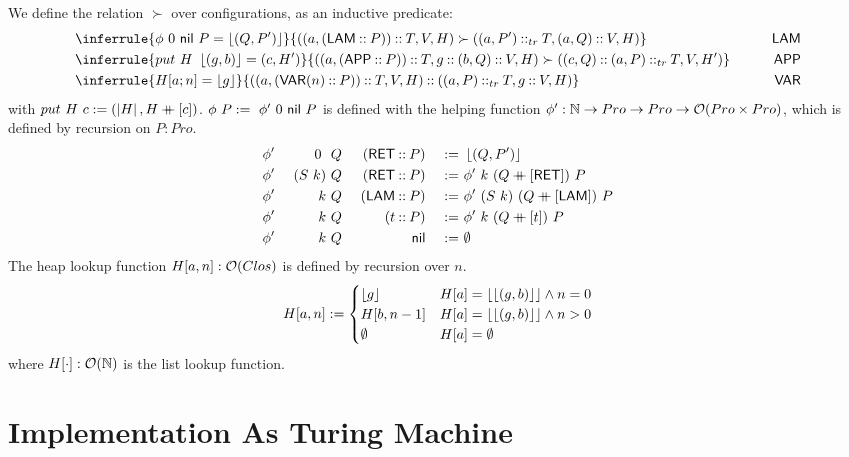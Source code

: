\begin{definition}
  We define the relation $\succ$ over configurations, as an inductive predicate:
  \begin{alignat*}{2}
    & \inferrule{\phi~0~\nil~P = \Some{(Q, P')}}{\left((a, (\MS{LAM} \cons P)) \cons T, V, H\right) \succ \left((a, P') \cons_{tr} T, (a,Q) \cons V, H\right) }
    \qquad& \MS{LAM} & \\
    & \inferrule{put~H~\Some{(g,b)} = (c,H')}{\left((a, (\MS{APP} \cons P)) \cons T, g \cons (b, Q) \cons V, H\right) \succ \left((c, Q) \cons (a,P) \cons_{tr} T, V, H'\right)}
    \qquad& \MS{APP} \\
    & \inferrule{H[a;n]=\Some{g}}{\left((a, (\MS{VAR}(n) \cons P)) \cons T, V, H\right) \cons \left((a, P) \cons_{tr} T, g \cons V, H\right)}
    \qquad& \MS{VAR} &
  \end{alignat*}
  with $ put~H~c := (\left| H \right|, H \mathbin{+\mkern-10mu+} [c]) $. $\phi~P :=~ \phi'~0~\mathsf{nil}~P$ is defined with the helping function
  $\phi' : \mathbb{N} \rightarrow Pro \rightarrow Pro \rightarrow \mathcal{O}(Pro \times Pro)$, which is defined by recursion on $P:Pro$.
  \begin{alignat*}{4}
    &\phi'&~0~   &~Q&~(\mathsf{RET} \mathbin{::} P) &&~:=~& \left\lfloor {(Q,P')} \right\rfloor \\
    &\phi'&~(S~k)&~Q&~(\mathsf{RET} \mathbin{::} P) &&~:=~& \phi'~k~(Q \mathbin{+\mkern-10mu+} [\mathsf{RET}])~P \\
    &\phi'&~k    &~Q&~(\mathsf{LAM} \mathbin{::} P) &&~:=~& \phi'~(S~k)~(Q \mathbin{+\mkern-10mu+} [\mathsf{LAM}])~P \\
    &\phi'&~k    &~Q&~(t        \mathbin{::} P) &&~:=~& \phi'~k~(Q \mathbin{+\mkern-10mu+} [t])~P \\
    &\phi'&~k    &~Q&~              \mathsf{nil} &&~:=~& \emptyset \\
  \end{alignat*}
  The heap lookup function $H[a,n] : \mathcal{O}(Clos)$ is defined by recursion over $n$.
  \[
    H[a,n] :=
    \begin{cases}
      \left\lfloor {g} \right\rfloor  & H[a]=\left\lfloor {\left\lfloor {(g,b)} \right\rfloor} \right\rfloor \land n=0 \\
      H[b, n-1] & H[a]=\left\lfloor {\left\lfloor {(g,b)} \right\rfloor} \right\rfloor \land n>0 \\
      \emptyset     & H[a]=\emptyset
    \end{cases}
  \]
  where $H[\cdot] : \mathcal{O}(\mathbb{N})$ is the list lookup function.
\end{definition}


\section{Implementation As Turing Machine}
\label{sec:heap-implementation}

